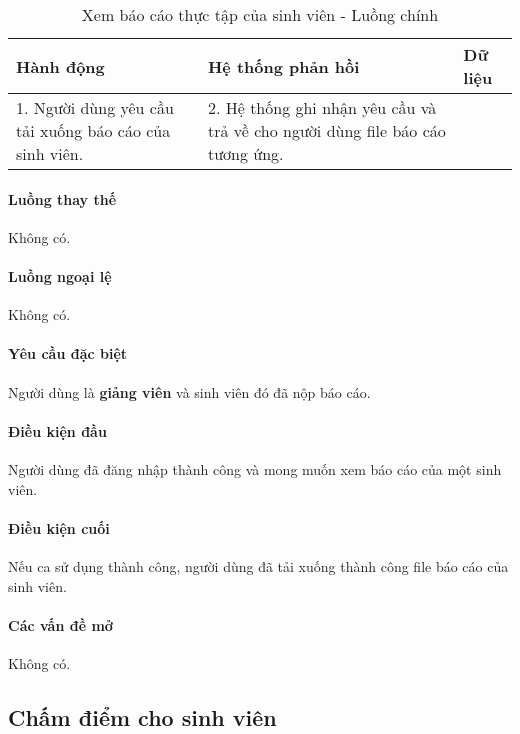 \documentclass[./../main.tex]{subfiles}
\begin{document}
\begin{table}[H]
	\caption{Xem báo cáo thực tập của sinh viên - Luồng chính}
	\label{tab:view_report}
	\begin{tabularx}{\textwidth}{|X|X|X|}
		\hline
		\textbf{Hành động}                                     & \textbf{Hệ thống phản hồi}                                                    & \textbf{Dữ liệu} \\ \hline
		1. Người dùng yêu cầu tải xuống báo cáo của sinh viên. & 2. Hệ thống ghi nhận yêu cầu và trả về cho người dùng file báo cáo tương ứng. &                  \\ \hline
	\end{tabularx}
\end{table}

\paragraph*{Luồng thay thế} Không có.

\paragraph*{Luồng ngoại lệ} Không có.

\paragraph*{Yêu cầu đặc biệt}

Người dùng là \textbf{giảng viên} và sinh viên đó đã nộp báo cáo.

\paragraph*{Điều kiện đầu}

Người dùng đã đăng nhập thành công và mong muốn xem báo cáo của một sinh viên.

\paragraph*{Điều kiện cuối}

Nếu ca sử dụng thành công, người dùng đã tải xuống thành công file báo cáo của sinh viên.

\paragraph*{Các vấn đề mở}

Không có.

\subsection{Chấm điểm cho sinh viên}
\end{document}
